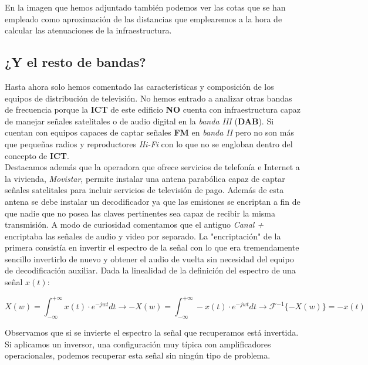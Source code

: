 \documentclass{article}[12 pt]
\begin{document}
			En la imagen que hemos adjuntado también podemos ver las cotas que se han empleado como aproximación de las distancias que emplearemos a la hora de calcular las atenuaciones de la infraestructura.

		\subsection{¿Y el resto de bandas?}
			Hasta ahora solo hemos comentado las características y composición de los equipos de distribución de televisión. No hemos entrado a analizar otras bandas de frecuencia porque la \textbf{ICT} de este edificio \textbf{NO} cuenta con infraestructura capaz de manejar señales satelitales o de audio digital en la \textit{banda III} (\textbf{DAB}). Si cuentan con equipos capaces de captar señales \textbf{FM} en \textit{banda II} pero no son más que pequeñas radios y reproductores \textit{Hi-Fi} con lo que no se engloban dentro del concepto de \textbf{ICT}.\\

			Destacamos además que la operadora que ofrece servicios de telefonía e Internet a la vivienda, \textit{Movistar}, permite instalar una antena parabólica capaz de captar señales satelitales para incluir servicios de televisión de pago. Además de esta antena se debe instalar un decodificador ya que las emisiones se encriptan a fin de que nadie que no posea las claves pertinentes sea capaz de recibir la misma transmisión. A modo de curiosidad comentamos que el antiguo \textit{Canal +} encriptaba las señales de audio y video por separado. La "encriptación" de la primera consistía en invertir el espectro de la señal con lo que era tremendamente sencillo invertirlo de nuevo y obtener el audio de vuelta sin necesidad del equipo de decodificación auxiliar. Dada la linealidad de la definición del espectro de una señal $x(t)$:

			$$X(w) = \int_{-\infty}^{+\infty} x(t) \cdot e^{-jwt}dt \rightarrow -X(w) = \int_{-\infty}^{+\infty} -x(t) \cdot e^{-jwt}dt \rightarrow \mathcal{F}^{-1}\{-X(w)\} = -x(t)$$

			Observamos que si se invierte el espectro la señal que recuperamos está invertida. Si aplicamos un inversor, una configuración muy típica con amplificadores operacionales, podemos recuperar esta señal sin ningún tipo de problema.
\end{document}
